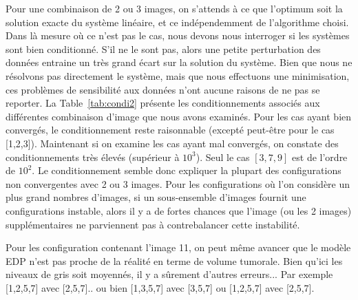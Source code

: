\documentclass[main.tex]{subfiles}
\begin{document}
Pour une combinaison de 2 ou 3 images, on s'attends à ce que l'optimum soit la solution exacte du système linéaire, et ce indépendemment de l'algorithme choisi. Dans là mesure où ce n'est pas le cas, nous devons nous interroger si les systèmes sont bien conditionné. S'il ne le sont pas, alors une petite perturbation des données entraine un très grand écart sur la solution du système. Bien que nous ne résolvons pas directement le système, mais que nous effectuons une minimisation, ces problèmes de sensibilité aux données n'ont aucune raisons de ne pas se reporter. La Table~\ref{tab:condi2} présente les conditionnements associés aux différentes combinaison d'image que nous avons examinés. Pour les cas ayant bien convergés, le conditionnement reste raisonnable (excepté peut-être pour le cas [1,2,3]). Maintenant si on examine les cas ayant mal convergés, on constate des conditionnements très élevés (supérieur à $10^3$). Seul le cas $[3,7,9]$ est de l'ordre de $10^2$. Le conditionnement semble donc expliquer la plupart des configurations non convergentes avec 2 ou 3 images. Pour les configurations où l'on considère un plus grand nombres d'images, si un sous-ensemble d'images fournit une configurations instable, alors il y a de fortes chances que l'image (ou les 2 images) supplémentaires ne parviennent pas à contrebalancer cette instabilité. 


Pour les configuration contenant l'image 11, on peut même avancer que le modèle EDP n'est pas proche de la réalité en terme de volume tumorale. Bien qu'ici les niveaux de gris soit moyennés, il y a sûrement d'autres erreurs... Par exemple [1,2,5,7] avec [2,5,7].. ou bien [1,3,5,7] avec [3,5,7] ou [1,2,5,7] avec [2,5,7].
\end{document}
